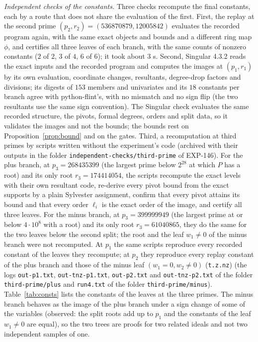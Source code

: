 \documentclass[11pt]{article}
\theoremstyle{remark}
\begin{document}
\emph{Independent checks of the constants.} Three checks recompute the final constants, each by a route that does not share the evaluation of the first. First, the replay at the second prime $(p_2,r_2)=(536870879,12005842)$ evaluates the recorded program again, with the same exact objects and bounds and a different ring map $\phi$, and certifies all three leaves of each branch, with the same counts of nonzero constants ($2$ of $2$, $3$ of $4$, $6$ of $6$);
it took about $3$ s. Second, Singular 4.3.2 reads the exact inputs and the recorded program and computes the images at $(p_1,r_1)$ by its own evaluation, coordinate changes, resultants, degree-drop factors and divisions; its digests of $153$ members and univariates and its $18$ constants per branch agree with python-flint's, with no mismatch and no sign flip (the two resultants use the same sign convention).
The Singular check evaluates the same recorded structure, the pivots, formal degrees, orders and split data, so it validates the images and not the bounds; the bounds rest on Proposition~\ref{prop:bound} and on the gates. Third, a recomputation at third primes by scripts written without the experiment's code (archived with their outputs in the folder \texttt{independent-checks/third-prime} of EXP-146). For the plus branch, at $p_3=268435399$ (the largest prime below $2^{28}$ at which $P$ has a root) and its only root $r_3=174414054$, the scripts recompute the exact levels with their own resultant code,
re-derive every pivot bound from the exact supports by a plain Sylvester assignment, confirm that every pivot attains its bound and that every order $\ell_i$ is the exact order of the image, and certify all three leaves. For the minus branch, at $p_3=399999949$ (the largest prime at or below $4\cdot10^8$ with a root) and its only root $r_3=61040865$, they do the same for the two leaves below the second split; the root and the leaf $w_1\ne0$ of the minus branch were not recomputed.
At $p_1$ the same scripts reproduce every recorded constant of the leaves they recompute; at $p_2$ they reproduce every replay constant of the plus branch and those of the minus leaf $(w_1=0,w_2\ne0)$ (\texttt{t.z.nz}) (the logs \texttt{out-p1.txt}, \texttt{out-tnz-p1.txt}, \texttt{out-p2.txt} and \texttt{out-tnz-p2.txt} of the folder \texttt{third-prime/plus} and \texttt{run4.txt} of the folder \texttt{third-prime/minus}). Table~\ref{tab:consts} lists the constants of the leaves at the three primes. The minus branch behaves as the image of the plus branch under a sign change of some of the variables (observed: the split roots add up to $p_1$ and the constants of the leaf $w_1\ne0$ are equal), so the two trees are proofs for two related ideals and not two independent samples of one.
\end{document}
